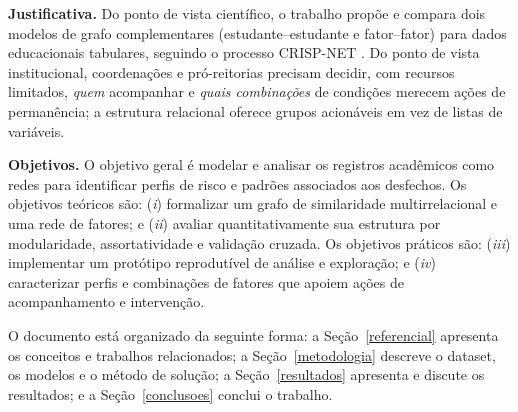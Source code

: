 \textbf{Justificativa.} Do ponto de vista científico, o trabalho propõe e compara dois modelos de grafo complementares (estudante--estudante e fator--fator) para dados educacionais tabulares, seguindo o processo CRISP-NET \citep{acuna2025}. Do ponto de vista institucional, coordenações e pró-reitorias precisam decidir, com recursos limitados, \textit{quem} acompanhar e \textit{quais combinações} de condições merecem ações de permanência; a estrutura relacional oferece grupos acionáveis em vez de listas de variáveis.

\textbf{Objetivos.} O objetivo geral é modelar e analisar os registros acadêmicos como redes para identificar perfis de risco e padrões associados aos desfechos. Os objetivos teóricos são: (\textit{i}) formalizar um grafo de similaridade multirrelacional e uma rede de fatores; e (\textit{ii}) avaliar quantitativamente sua estrutura por modularidade, assortatividade e validação cruzada. Os objetivos práticos são: (\textit{iii}) implementar um protótipo reprodutível de análise e exploração; e (\textit{iv}) caracterizar perfis e combinações de fatores que apoiem ações de acompanhamento e intervenção.

O documento está organizado da seguinte forma: a Seção~\ref{referencial} apresenta os conceitos e trabalhos relacionados; a Seção~\ref{metodologia} descreve o dataset, os modelos e o método de solução; a Seção~\ref{resultados} apresenta e discute os resultados; e a Seção~\ref{conclusoes} conclui o trabalho.
